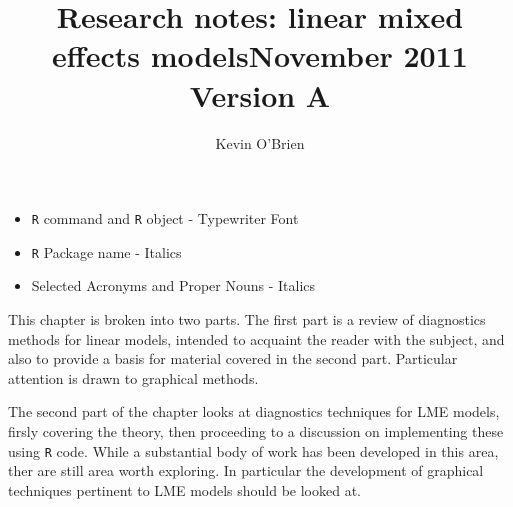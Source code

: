 \documentclass[12pt, a4paper]{report}
\title{Research notes: linear mixed effects models}
\author{ } \date{ }
\theoremstyle{plain}
\theoremstyle{definition}
\theoremstyle{remark}
\begin{document}
	\author{Kevin O'Brien}
	\title{November 2011 Version A}
	
	
	
	
	\tableofcontents \setcounter{tocdepth}{1}
	
\begin{framed} 
\begin{itemize}
	\item \texttt{R} command and \texttt{R} object - Typewriter Font
	\item \texttt{R} Package name - Italics
	\item Selected Acronyms and Proper Nouns - Italics
\end{itemize}
\end{framed}
\newpage


This chapter is broken into two parts. The first part is a review of diagnostics methods for linear models, intended to acquaint the
reader with the subject, and also to provide a basis for material covered in the second part. Particular attention is drawn to graphical methods.

The second part of the chapter looks at diagnostics techniques for LME models, firsly covering the theory, then proceeding to a discussion on 
implementing these using \texttt{R} code.
While a substantial body of work has been developed in this area, ther are still area worth exploring. 
In particular the development of graphical techniques pertinent to LME models should be looked at.
\newpage





%

%

%

%







%






\end{document}
